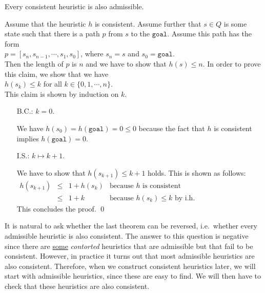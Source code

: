 \begin{Theorem}
  Every consistent heuristic is also admissible. 
\end{Theorem}

\proof
Assume that the heuristic $h$ is consistent.  Assume further that $s \in Q$ is some state such that there is a
path $p$ from $s$ to the $\mathtt{goal}$.  Assume this path has the form
\\[0.2cm]
\hspace*{1.3cm}
$p = [s_n, s_{n-1}, \cdots, s_1, s_0]$, \quad where $s_n = s$ and $s_0 = \mathtt{goal}$.
\\[0.2cm]
Then the length of $p$ is $n$ and we have to show that $h(s) \leq n$.  In order to prove this claim, we show
that we have
\\[0.2cm]
\hspace*{1.3cm}
$h(s_k) \leq k$ \quad for all $k \in \{0, 1, \cdots, n\}$.
\\[0.2cm]
This claim is shown by induction on $k$.
\begin{enumerate}
\item[B.C.:] $k=0$.

             We have $h(s_0) = h(\mathtt{goal}) = 0 \leq 0$ because the fact that $h$ is consistent implies 
             $h(\mathtt{goal}) = 0$. 
\item[I.S.:] $k \mapsto k+1$.
  
             We have to show that $h(s_{k+1}) \leq k + 1$ holds.  This is shown as follows:
             \\[0.2cm]
             \hspace*{1.3cm}
             $
             \begin{array}{lcll}
               h(s_{k+1}) & \leq & 1 + h(s_k) & \mbox{because $h$ is consistent} \\[0.2cm]
                         & \leq & 1 + k      & \mbox{because $h(s_k) \leq k$ by i.h.}
             \end{array}
             $
             \\[0.2cm]
             This concludes the proof.  \qed
\end{enumerate}

It is natural to ask whether the last theorem can be reversed, i.e.~whether every admissible heuristic is also
consistent.  The answer to this question is negative since there are
\href{http://web.cs.du.edu/~sturtevant/papers/incnew.pdf}{some} \emph{\color{red}contorted}
heuristics that are admissible but that fail to be consistent.  However, in practice it turns out that most 
admissible heuristics are also consistent.  Therefore, when we construct consistent heuristics later, we will
start with admissible heuristics, since these are easy to find.  We will then have to check that these 
heuristics are also consistent.  

